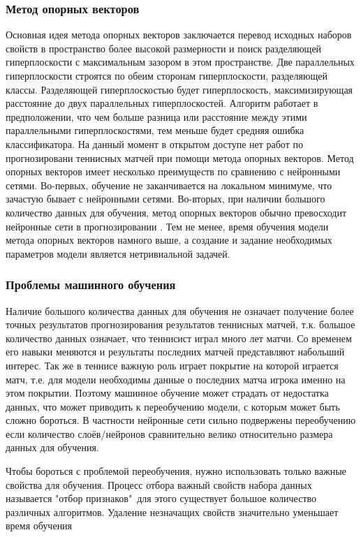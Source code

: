 \subsubsection{Метод опорных векторов}
Основная идея метода опорных векторов заключается перевод исходных наборов свойств  в пространство более высокой размерности и поиск разделяющей гиперплоскости с максимальным зазором в этом пространстве. Две параллельных гиперплоскости строятся по обеим сторонам гиперплоскости, разделяющей классы. Разделяющей гиперплоскостью будет гиперплоскость, максимизирующая расстояние до двух параллельных гиперплоскостей. Алгоритм работает в предположении, что чем больше разница или расстояние между этими параллельными гиперплоскостями, тем меньше будет средняя ошибка классификатора.
На данный момент в открытом доступе нет работ по прогнозировани теннисных матчей при помощи метода опорных векторов\cite{Book13}. Метод опорных векторов имеет несколько преимуществ по сравнению с нейронными сетями. Во-первых, обучение не заканчивается на локальном минимуме, что зачастую бывает с нейронными сетями. Во-вторых, при наличии большого количество данных для обучения, метод опорных векторов обычно превосходит нейронные сети в прогнозировании \cite{Book13}. Тем не менее, время обучения модели метода опорных векторов намного выше, а создание и задание необходимых параметров модели является нетривиальной задачей.

\subsubsection{Проблемы машинного обучения}
Наличие большого количества данных для обучения не означает получение более точных результатов прогнозирования результатов теннисных матчей, т.к. большое количество данных означает, что теннисист играл много лет матчи. Со временем его навыки меняются и результаты последних матчей представляют набольший интерес. Так же в теннисе важную роль играет покрытие на которой играется матч, т.е. для модели необходимы данные о последних матча игрока именно на этом покрытии. Поэтому машинное обучение может страдать от недостатка данных, что может приводить к переобучению модели, с которым может быть сложно бороться. В частности нейронные сети сильно подвержены переобучению если количество слоёв/нейронов сравнительно велико относительно размера данных для обучения.

Чтобы бороться с проблемой переобучения, нужно использовать только важные свойства для обучения. Процесс отбора важный свойств набора данных называется "отбор признаков"\, для этого существует большое количество различных алгоритмов. Удаление незначащих свойств значительно уменьшает время обучения
